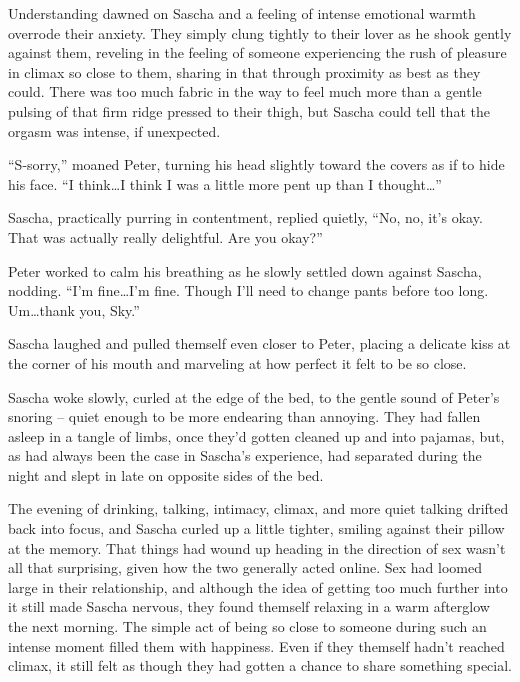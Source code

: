 Understanding dawned on Sascha and a feeling of intense emotional warmth overrode their anxiety. They simply clung tightly to their lover as he shook gently against them, reveling in the feeling of someone experiencing the rush of pleasure in climax so close to them, sharing in that through proximity as best as they could. There was too much fabric in the way to feel much more than a gentle pulsing of that firm ridge pressed to their thigh, but Sascha could tell that the orgasm was intense, if unexpected.

``S-sorry,'' moaned Peter, turning his head slightly toward the covers as if to hide his face. ``I think\ldots{}I think I was a little more pent up than I thought\ldots{}''

Sascha, practically purring in contentment, replied quietly, ``No, no, it's okay. That was actually really delightful. Are you okay?''

Peter worked to calm his breathing as he slowly settled down against Sascha, nodding. ``I'm fine\ldots{}I'm fine. Though I'll need to change pants before too long. Um\ldots{}thank you, Sky.''

Sascha laughed and pulled themself even closer to Peter, placing a delicate kiss at the corner of his mouth and marveling at how perfect it felt to be so close.

\secdiv{}

Sascha woke slowly, curled at the edge of the bed, to the gentle sound of Peter's snoring -- quiet enough to be more endearing than annoying. They had fallen asleep in a tangle of limbs, once they'd gotten cleaned up and into pajamas, but, as had always been the case in Sascha's experience, had separated during the night and slept in late on opposite sides of the bed.

The evening of drinking, talking, intimacy, climax, and more quiet talking drifted back into focus, and Sascha curled up a little tighter, smiling against their pillow at the memory. That things had wound up heading in the direction of sex wasn't all that surprising, given how the two generally acted online. Sex had loomed large in their relationship, and although the idea of getting too much further into it still made Sascha nervous, they found themself relaxing in a warm afterglow the next morning. The simple act of being so close to someone during such an intense moment filled them with happiness. Even if they themself hadn't reached climax, it still felt as though they had gotten a chance to share something special.

